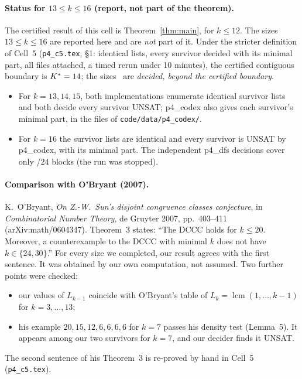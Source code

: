 \documentclass[11pt]{article}
\theoremstyle{definition}
\theoremstyle{remark}
\begin{document}
\paragraph{Status for $13\le k\le16$ (report, not part of the theorem).}{\sloppy The certified result
of this cell is Theorem~\ref{thm:main}, for $k\le12$. The sizes $13\le k\le16$ are reported here
and are \emph{not} part of it. Under the stricter definition of Cell~5 (\texttt{p4\_c5.tex},
\S1: identical lists, every survivor decided with its minimal part, all files attached, a timed
rerun under 10 minutes), the certified contiguous boundary is $K^\ast=14$; the sizes
\Beyond\ are \emph{decided, beyond the certified boundary}.\par}
\begin{itemize}
\item For $k=13,14,15$, both implementations enumerate identical survivor lists and both decide
  every survivor UNSAT; p4\_codex also gives each survivor's minimal part, in the files of
  \texttt{code/data/p4\_codex/}.
\item For $k=16$ the survivor lists are identical and every survivor is UNSAT by p4\_codex, with
  its minimal part. The independent p4\_dfs decisions cover only \kXVIblocks/24 blocks (the run
  was stopped).
\end{itemize}

\paragraph{Comparison with O'Bryant (2007).}
K.\ O'Bryant, \emph{On Z.-W.\ Sun's disjoint congruence classes conjecture}, in \emph{Combinatorial
Number Theory}, de Gruyter 2007, pp.~403--411 (arXiv:math/0604347). Theorem~3 states: ``The DCCC
holds for $k\le20$. Moreover, a counterexample to the DCCC with minimal $k$ does not have
$k\in\{24,30\}$.'' For every size we completed, our result agrees with the first sentence. It was
obtained by our own computation, not assumed. Two further points were checked:
\begin{itemize}
\item our values of $L_{k-1}$ coincide with O'Bryant's table of $L_k=\operatorname{lcm}(1,\dots,k-1)$
  for $k=3,\dots,13$;
\item his example $20,15,12,6,6,6,6$ for $k=7$ passes his density test (Lemma~5). It appears
  among our two survivors for $k=7$, and our decider finds it UNSAT.
\end{itemize}
The second sentence of his Theorem~3 is re-proved by hand in Cell~5 (\texttt{p4\_c5.tex}).
\end{document}
